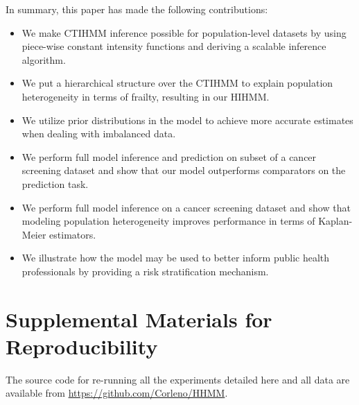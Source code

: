 \documentclass{article}
\begin{document}
In summary, this paper has made the following contributions:
\begin{itemize}
	\item We make CTIHMM inference possible for population-level datasets by using piece-wise constant intensity functions and deriving a scalable inference algorithm.
	\item We put a hierarchical structure over the CTIHMM to explain population heterogeneity in terms of frailty, resulting in our HIHMM.
	\item We utilize prior distributions in the model to achieve more accurate estimates when dealing with imbalanced data.    
	\item We perform full model inference and prediction on subset of a cancer screening dataset and show that our model outperforms comparators on the prediction task.
	\item We perform full model inference on a cancer screening dataset and show that modeling population heterogeneity improves performance in terms of Kaplan-Meier estimators. 
	\item We illustrate how the model may be used to better inform public health professionals by providing a risk stratification mechanism. 
\end{itemize}


\newpage



\newpage
\appendix
\section{Supplemental Materials for Reproducibility}
The source code for re-running all the experiments detailed here and all data are available from \url{https://github.com/Corleno/HHMM}.
\end{document}
